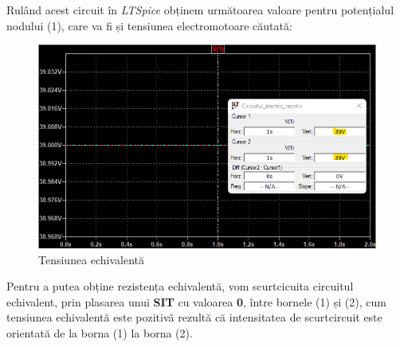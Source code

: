 \documentclass[12pt, a4paper]{article}
\begin{document}
\newpage
Rulând acest circuit în \emph{LTSpice} obținem următoarea valoare pentru potențialul nodului (1), care va fi și tensiunea electromotoare căutată:
\begin{figure}[h]
    \centering
    \includegraphics[width=\linewidth, height=\textheight, keepaspectratio]{Tensiune_echivalenta.png}
    \caption{Tensiunea echivalentă}
    \label{fig:euler}
\end{figure}

Pentru a putea obține rezistența echivalentă, vom scurtcicuita circuitul echivalent, prin plasarea unui \textbf{SIT} cu valoarea \textbf{0}, între bornele (1) și (2), cum tensiunea echivalentă este pozitivă rezultă că intensitatea de scurtcircuit este orientată de la borna (1) la borna (2).
\end{document}
